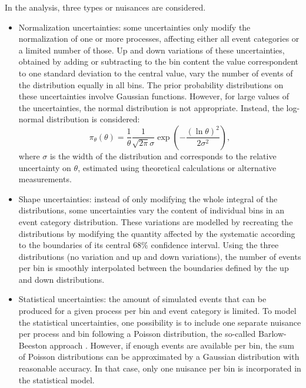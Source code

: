 \documentclass[../main.tex]{subfiles}
\begin{document}
In the \hhbbtt{} analysis, three types or nuisances are considered. 
\begin{itemize}
\item Normalization uncertainties: some uncertainties only modify the normalization of one or more processes, affecting either all event categories or a limited number of those. Up and down variations of these uncertainties, obtained by adding or subtracting to the bin content the value correspondent to one standard deviation to the central value, vary the number of events of the distribution equally in all bins. The prior probability distributions on these uncertainties involve Gaussian functions. However, for large values of the uncertainties, the normal distribution is not appropriate. Instead, the log-normal distribution is considered:
\begin{equation}
\pi_\theta(\theta) = \frac{1}{\theta}\frac{1}{\sqrt{2\pi}\sigma}\exp\left(-\frac{(\ln\theta)^2}{2\sigma^2}\right),
\end{equation}
where $\sigma$ is the width of the distribution and corresponds to the relative uncertainty on $\theta$, estimated using theoretical calculations or alternative measurements.

\item Shape uncertainties: instead of only modifying the whole integral of the distributions, some uncertainties vary the content of individual bins in an event category distribution. These variations are modelled by recreating the distributions by modifying the quantity affected by the systematic according to the boundaries of its central 68\% confidence interval. Using the three distributions (no variation and up and down variations), the number of events per bin is smoothly interpolated between the boundaries defined by the up and down distributions.

\item Statistical uncertainties: the amount of simulated events that can be produced for a given process per bin and event category is limited. To model the statistical uncertainties, one possibility is to include one separate nuisance per process and bin following a Poisson distribution, the so-called Barlow-Beeston approach \cite{hh:results:barlow_beeston}. However, if enough events are available per bin, the sum of Poisson distributions can be approximated by a Gaussian distribution with reasonable accuracy. In that case, only one nuisance per bin is incorporated in the statistical model.
\end{itemize}
\end{document}
